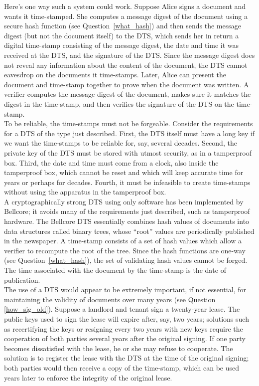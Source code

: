 Here's one way such a system could work. Suppose Alice signs a document and
wants it time-stamped. She computes a message digest of the document using
a secure hash function (see Question~\ref{what_hash}) and then sends the
message digest (but not the document itself) to the DTS, which sends her in
return a digital time-stamp consisting of the message digest, the date and
time it was received at the DTS, and the signature of the DTS. Since the
message digest does not reveal any information about the content of the
document, the DTS cannot eavesdrop on the documents it time-stamps. Later,
Alice can present the document and time-stamp together to prove when the
document was written. A verifier computes the message digest of the
document, makes sure it matches the digest in the time-stamp, and then
verifies the signature of the DTS on the time-stamp.\\

To be reliable, the time-stamps must not be forgeable. Consider the
requirements for a DTS of the type just described. First, the DTS
itself must have a long key if we want the time-stamps to be reliable
for, say, several decades. Second, the private key of the DTS must be
stored with utmost security, as in a tamperproof box. Third, the date
and time must come from a clock, also inside the tamperproof box, which
cannot be reset and which will keep accurate time for years or perhaps
for decades. Fourth, it must be infeasible to create time-stamps
without using the apparatus in the tamperproof box.\\

A cryptographically strong DTS using only software has been implemented by
Bellcore; it avoids many of the requirements just described, such as
tamperproof hardware. The Bellcore DTS essentially combines hash values of
documents into data structures called binary trees, whose ``root'' values
are periodically published in the newspaper. A time-stamp consists of a set
of hash values which allow a verifier to recompute the root of the tree.
Since the hash functions are one-way (see Question~\ref{what_hash}), the
set of validating hash values cannot be forged. The time associated with
the document by the time-stamp is the date of publication.\\

The use of a DTS would appear to be extremely important, if not essential,
for maintaining the validity of documents over many years (see Question
\ref{how_sig_old}). Suppose a landlord and tenant sign a twenty-year lease.
The public keys used to sign the lease will expire after, say, two years;
solutions such as recertifying the keys or resigning every two years with
new keys require the cooperation of both parties several years after the
original signing. If one party becomes dissatisfied with the lease, he or
she may refuse to cooperate. The solution is to register the lease with the
DTS at the time of the original signing; both parties would then receive a
copy of the time-stamp, which can be used years later to enforce the
integrity of the original lease.\\

